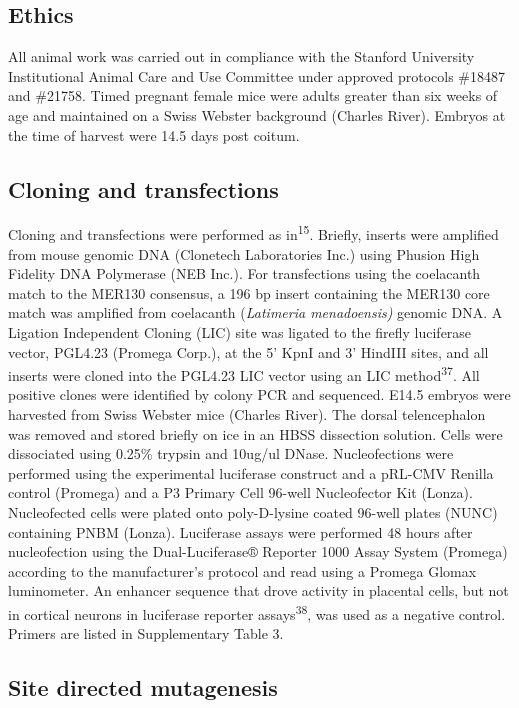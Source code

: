 \documentclass[]{article}
\begin{document}
\subsection{Ethics}\label{ethics}

All animal work was carried out in compliance with the Stanford
University Institutional Animal Care and Use Committee under approved
protocols \#18487 and \#21758. Timed pregnant female mice were adults
greater than six weeks of age and maintained on a Swiss Webster
background (Charles River). Embryos at the time of harvest were 14.5
days post coitum.

\subsection{ Cloning and transfections}\label{cloning-and-transfections}

Cloning and transfections were performed as in\textsuperscript{15}.
Briefly, inserts were amplified from mouse genomic DNA (Clonetech
Laboratories Inc.) using Phusion High Fidelity DNA Polymerase (NEB
Inc.). For transfections using the coelacanth match to the MER130
consensus, a 196 bp insert containing the MER130 core match was
amplified from coelacanth (\emph{Latimeria menadoensis)} genomic DNA. A
Ligation Independent Cloning (LIC) site was ligated to the firefly
luciferase vector, PGL4.23 (Promega Corp.), at the 5' KpnI and 3'
HindIII sites, and all inserts were cloned into the PGL4.23 LIC vector
using an LIC method\textsuperscript{37}. All positive clones were
identified by colony PCR and sequenced. E14.5 embryos were harvested
from Swiss Webster mice (Charles River). The dorsal telencephalon was
removed and stored briefly on ice in an HBSS dissection solution. Cells
were dissociated using 0.25\% trypsin and 10ug/ul DNase. Nucleofections
were performed using the experimental luciferase construct and a pRL-CMV
Renilla control (Promega) and a P3 Primary Cell 96-well Nucleofector Kit
(Lonza). Nucleofected cells were plated onto poly-D-lysine coated
96-well plates (NUNC) containing PNBM (Lonza). Luciferase assays were
performed 48 hours after nucleofection using the Dual-Luciferase®
Reporter 1000 Assay System (Promega) according to the manufacturer's
protocol and read using a Promega Glomax luminometer. An enhancer
sequence that drove activity in placental cells, but not in cortical
neurons in luciferase reporter assays\textsuperscript{38}, was used as a
negative control. Primers are listed in Supplementary Table 3.

\subsection{Site directed mutagenesis}\label{site-directed-mutagenesis}
\end{document}
